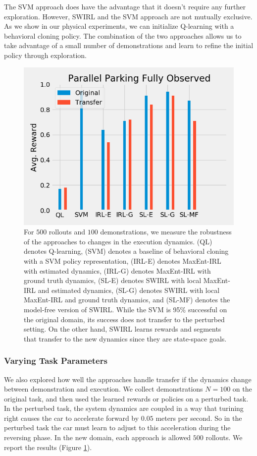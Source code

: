 The SVM approach does have the advantage that it doesn't require any further exploration.
However, SWIRL and the SVM approach are not mutually exclusive. 
As we show in our physical experiments, we can initialize Q-learning with a behavioral cloning policy. 
The combination of the two approaches allows us to take advantage of a small number of demonstrations and learn to refine the initial policy through exploration.


\begin{figure}[t]
\centering
 \includegraphics[width=0.8\columnwidth]{new-exp/pp-fo3.png}
 \caption{For $500$ rollouts  and $100$ demonstrations, we measure the robustness of the approaches to changes in the execution dynamics. (QL) denotes Q-learning, (SVM) denotes a baseline of behavioral cloning with a SVM policy representation, (IRL-E) denotes MaxEnt-IRL with estimated dynamics, (IRL-G) denotes MaxEnt-IRL with ground truth dynamics, (SL-E) denotes SWIRL with local MaxEnt-IRL and estimated dynamics, (SL-G) denotes SWIRL with local MaxEnt-IRL and ground truth dynamics, and (SL-MF) denotes the model-free version of SWIRL. While the SVM is 95\% successful on the original domain, its success does not transfer to the perturbed setting. On the other hand, SWIRL learns rewards and segments that transfer to the new dynamics since they are state-space goals. \label{exp:pp-fo3}}
\end{figure}

\subsubsection{Varying Task Parameters}
We also explored how well the approaches handle transfer if the dynamics change between demonstration and execution.
We collect demonstrations $N=100$ on the original task, and then used the learned rewards or policies on a perturbed task.
In the perturbed task, the system dynamics are coupled in a way that turining right causes the car to accelerate forward by $0.05$ meters per second.
So in the perturbed task the car must learn to adjust to this acceleration during the reversing phase.
In the new domain, each approach is allowed $500$ rollouts. 
We report the results (Figure \ref{exp:pp-fo3}).

